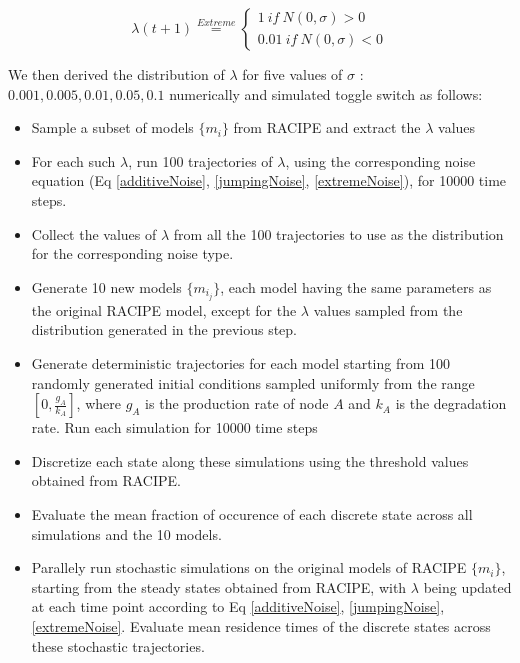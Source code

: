 \documentclass[11pt]{article}
\begin{document}
\begin{equation}
    \lambda (t+1) \overset{Extreme}{=} \begin{cases}
        1 \ if \ N(0,\sigma) > 0\\
        0.01 \ if \ N(0,\sigma) < 0
    \end{cases}
    \label{extremeNoise}
\end{equation}



We then derived the distribution of $\lambda$ for five values of $\sigma$ : ${0.001, 0.005, 0.01, 0.05, 0.1}$ numerically and simulated toggle switch as follows:

\begin{itemize}
    \item Sample a subset of models $\{m_i\}$ from RACIPE and extract the $\lambda$ values
    \item For each such $\lambda$, run 100 trajectories of $\lambda$, using the corresponding noise equation (Eq \ref{additiveNoise}, \ref{jumpingNoise}, \ref{extremeNoise}), for 10000 time steps.
    \item Collect the values of $\lambda$ from all the 100 trajectories to use as the distribution for the corresponding noise type. 
    \item Generate 10 new models $\{m_{i_j}\}$, each model having the same parameters as the original RACIPE model, except for the $\lambda$ values sampled from the distribution generated in the previous step.
    \item Generate deterministic trajectories for each model starting from 100 randomly generated initial conditions sampled uniformly from the range $[0, \frac{g_A}{k_A}]$, where $g_A$ is the production rate of node $A$ and $k_A$ is the degradation rate. Run each simulation for 10000 time steps
    \item Discretize each state along these simulations using the threshold values obtained from RACIPE. 
    \item Evaluate the mean fraction of occurence of each discrete state across all simulations and the 10 models.
    \item Parallely run stochastic simulations on the original models of RACIPE $\{m_i\}$, starting from the steady states obtained from RACIPE, with $\lambda$ being updated at each time point according to Eq \ref{additiveNoise}, \ref{jumpingNoise}, \ref{extremeNoise}. Evaluate mean residence times of the discrete states across these stochastic trajectories.
\end{itemize}
\end{document}
